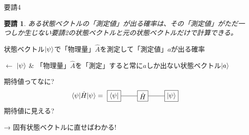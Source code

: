 \documentclass[dvipdfm]{beamer}
\newtheorem*{requirement}{要請}
\begin{document}
\begin{frame}{要請4}
    \begin{requirement}
        ある状態ベクトルの「測定値」が出る確率は、その「測定値」がただ一つしか生じない要請2の状態ベクトルと元の状態ベクトルだけで計算できる。
    \end{requirement}
    状態ベクトル$\ket{\psi}$で「物理量」$\hat{A}$を測定して「測定値」$a$が出る確率

    $\longleftarrow$
    $\ket{\psi}$
    \&
    「物理量」$\hat{A}$を「測定」すると常に$a$しか出ない状態ベクトル$\ket{a}$
\end{frame}




\begin{frame}{期待値ってなに?}
    \begin{equation*}
        \ev{\hat{H}}{\psi}
        =
        \vcenter{\hbox{
            \begin{tikzpicture}
                \node at(0,0)[draw, rectangle](H){$\hat{H}$};
                \node at(1.5,0)[draw, rectangle](ket){$\ket{\psi}$};
                \node at(-1.5,0)[draw, rectangle](bra){$\bra{\psi}$};
                \draw(H.west)--(bra.east);
                \draw(H.east)--(ket.west);
            \end{tikzpicture}
        }}
    \end{equation*}
    期待値に見える?

    → 固有状態ベクトルに直せばわかる!
\end{frame}
\end{document}
